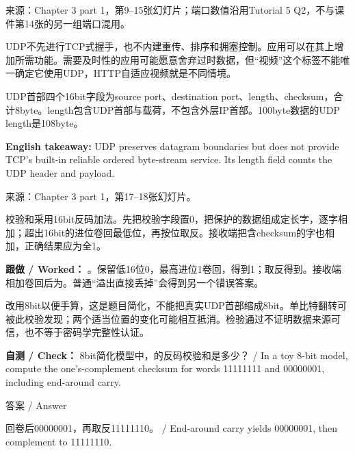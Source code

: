 来源：Chapter 3 part 1，第9–15张幻灯片；端口数值沿用Tutorial 5 Q2，不与课件第14张的另一组端口混用。








UDP不先进行TCP式握手，也不内建重传、排序和拥塞控制。应用可以在其上增加所需功能。需要及时性的应用可能愿意舍弃过时数据，但“视频”这个标签不能唯一确定它使用UDP，HTTP自适应视频就是不同情境。


UDP首部四个16bit字段为source port、destination port、length、checksum，合计8byte。length包含UDP首部与载荷，不包含外层IP首部。100byte数据的UDP length是108byte。


\textbf{English takeaway:} UDP preserves datagram boundaries but does not provide TCP's built-in reliable ordered byte-stream service. Its length field counts the UDP header and payload.


来源：Chapter 3 part 1，第17–18张幻灯片。








校验和采用16bit反码加法。先把校验字段置0，把保护的数据组成定长字，逐字相加；超出16bit的进位卷回最低位，再按位取反。接收端把含checksum的字也相加，正确结果应为全1。


\textbf{跟做 / Worked：} 。保留低16位0，最高进位1卷回，得到1；取反得到。接收端相加卷回后为。普通“溢出直接丢掉”会得到另一个错误答案。


改用8bit以便手算，这是题目简化，不能把真实UDP首部缩成8bit。单比特翻转可被此校验发现；两个适当位置的变化可能相互抵消。检验通过不证明数据来源可信，也不等于密码学完整性认证。


\textbf{自测 / Check：} 8bit简化模型中，的反码校验和是多少？ / In a toy 8-bit model, compute the one’s-complement checksum for words 11111111 and 00000001, including end-around carry.



\begin{StudySolution}{答案 / Answer}


回卷后00000001，再取反11111110。 / End-around carry yields 00000001, then complement to 11111110.


\end{StudySolution}


